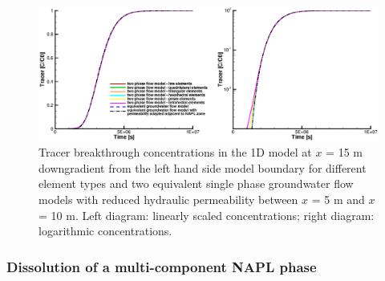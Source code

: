 \begin{figure}[htbp]
\centering
\includegraphics[width=1\textwidth]{C/figures/NAPL_diss_BTC.eps}
\caption{Tracer breakthrough concentrations in the 1D model at $x$ = 15 m downgradient from the left hand side model boundary for different element types and two equivalent single phase groundwater flow models with reduced hydraulic permeability between $x$ = 5 m and $x$ = 10 m. Left diagram: linearly scaled concentrations; right diagram: logarithmic concentrations.}
\label{profiles_tracer_NAPLtransp}
\end{figure}


\subsubsection{Dissolution of a multi-component NAPL phase}
\label{NAPL_diss_BM_diss}

